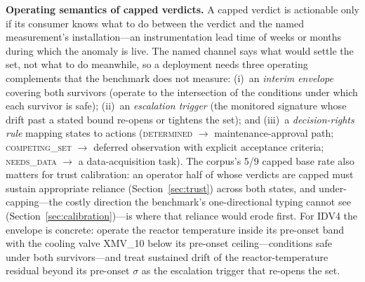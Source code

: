 \documentclass[preprint,10pt]{elsarticle}
\begin{document}
\textbf{Operating semantics of capped verdicts.} A capped verdict is actionable only if its consumer knows what to do between the verdict and the named measurement's installation---an instrumentation lead time of weeks or months during which the anomaly is live. The named channel says what would settle the set, not what to do meanwhile, so a deployment needs three operating complements that the benchmark does not measure: (i)~an \emph{interim envelope} covering both survivors (operate to the intersection of the conditions under which each survivor is safe); (ii)~an \emph{escalation trigger} (the monitored signature whose drift past a stated bound re-opens or tightens the set); and (iii)~a \emph{decision-rights rule} mapping states to actions (\mbox{\textsc{determined}} $\to$ maintenance-approval path; \mbox{\textsc{competing\_set}} $\to$ deferred observation with explicit acceptance criteria; \textsc{needs\_data} $\to$ a data-acquisition task). The corpus's 5/9 capped base rate also matters for trust calibration: an operator half of whose verdicts are capped must sustain appropriate reliance (Section~\ref{sec:trust}) across both states, and under-capping---the costly direction the benchmark's one-directional typing cannot see (Section~\ref{sec:calibration})---is where that reliance would erode first. For IDV4 the envelope is concrete: operate the reactor temperature inside its pre-onset band with the cooling valve XMV\_10 below its pre-onset ceiling---conditions safe under both survivors---and treat sustained drift of the reactor-temperature residual beyond its pre-onset $\sigma$ as the escalation trigger that re-opens the set.
\end{document}

